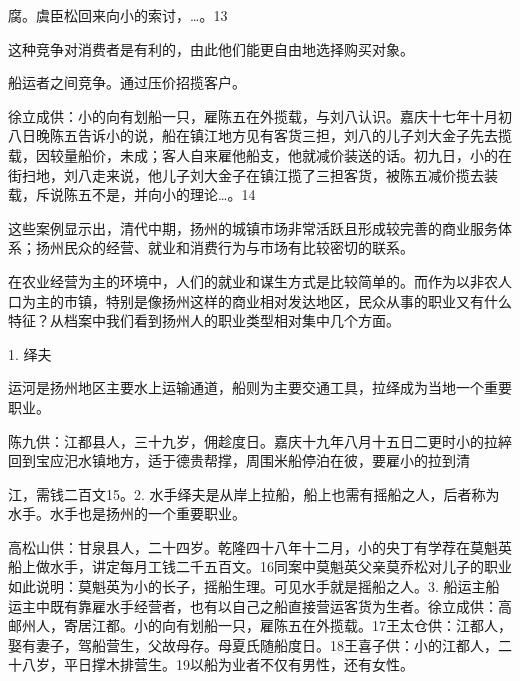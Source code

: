 \begin{BookQuote}
腐。虞臣松回来向小的索讨，…。13
\end{BookQuote}

这种竞争对消费者是有利的，由此他们能更自由地选择购买对象。

船运者之间竞争。通过压价招揽客户。

\begin{BookQuote}
徐立成供：小的向有划船一只，雇陈五在外揽载，与刘八认识。嘉庆十七年十月初八日晚陈五告诉小的说，船在镇江地方见有客货三担，刘八的儿子刘大金子先去揽载，因较量船价，未成；客人自来雇他船支，他就减价装送的话。初九日，小的在街扫地，刘八走来说，他儿子刘大金子在镇江揽了三担客货，被陈五减价揽去装载，斥说陈五不是，并向小的理论…。14
\end{BookQuote}

这些案例显示出，清代中期，扬州的城镇市场非常活跃且形成较完善的商业服务体系；扬州民众的经营、就业和消费行为与市场有比较密切的联系。


在农业经营为主的环境中，人们的就业和谋生方式是比较简单的。而作为以非农人口为主的市镇，特别是像扬州这样的商业相对发达地区，民众从事的职业又有什么特征？从档案中我们看到扬州人的职业类型相对集中几个方面。


1. 绎夫

运河是扬州地区主要水上运输通道，船则为主要交通工具，拉绎成为当地一个重要职业。

陈九供：江都县人，三十九岁，佣趁度日。嘉庆十九年八月十五日二更时小的拉綷回到宝应汜水镇地方，适于德贵帮撑，周围米船停泊在彼，要雇小的拉到清

\vfill
\begin{BookNotes}
\end{BookNotes}

\noindent 江，需钱二百文15。2. 水手绎夫是从岸上拉船，船上也需有摇船之人，后者称为水手。水手也是扬州的一个重要职业。

高松山供：甘泉县人，二十四岁。乾隆四十八年十二月，小的央丁有学荐在莫魁英船上做水手，讲定每月工钱二千五百文。16同案中莫魁英父亲莫乔松对儿子的职业如此说明：莫魁英为小的长子，摇船生理。可见水手就是摇船之人。3. 船运主船运主中既有靠雇水手经营者，也有以自己之船直接营运客货为生者。徐立成供：高邮州人，寄居江都。小的向有划船一只，雇陈五在外揽载。17王太仓供：江都人，娶有妻子，驾船营生，父故母存。母夏氏随船度日。18王喜子供：小的江都人，二十八岁，平日撑木排营生。19以船为业者不仅有男性，还有女性。

